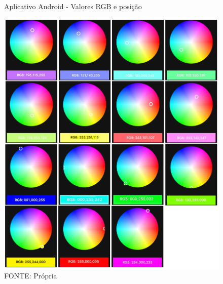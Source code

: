 \begin{figure}[htb]
	\centering
	\caption{Aplicativo Android - Valores RGB e posição}
	\includegraphics[width=1.0\textwidth]{figures/example_1_arduino_color}
	\caption*{FONTE: Própria}
	\label{hsv_exemplo_1}
\end{figure}


